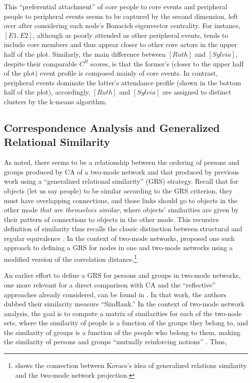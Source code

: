 \documentclass[a4paper,fleqn]{cas-sc}
\begin{document}
This ``preferential attachment'' \citep{barabasi1999emergence} of core people to core events and peripheral people to peripheral events seems to be captured by the second dimension, left over after considering each node's Bonacich eigenvector centrality. For instance, $\left[E1, E2\right]$, although as poorly attended as other peripheral events, tends to include core members and thus appear closer to other core actors in the upper half of the plot. Similarly, the main difference between $\left[Ruth\right]$ and $\left[Sylvia\right]$, despite their comparable $C^B$ scores, is that the former's (closer to the upper half of the plot) event profile is composed mainly of core events. In contrast, peripheral events dominate the latter's attendance profile (shown in the bottom half of the plot), accordingly, $\left[Ruth\right]$ and $\left[Sylvia\right]$ are assigned to distinct clusters by the k-means algorithm. 

\subsection{Correspondence Analysis and Generalized Relational Similarity} \label{subsec:cagensim}
As noted, there seems to be a relationship between the ordering of persons and groups produced by CA of a two-mode network and that produced by previous work using a ``generalized relational similarity'' (GRS) strategy. Recall that for objects (let us say people) to be similar according to the GRS criterion, they must have overlapping connections, and those links should go to objects in the other mode \textit{that are themselves similar}, where objects' similarities are given by their pattern of connections to objects in the other mode. This recursive definition of similarity thus recalls the classic distinction between structural and regular equivalence \citep{everett1994regular}. In the context of two-mode networks, \citet{kovacs2010generalized} proposed one such approach to defining a GRS for nodes in one and two-mode networks using a modified version of the correlation distance.\footnote{\citet{lizardo2024two} shows the connection between Kovacs's idea of generalized relations similarity and the two-mode network projection.}

An earlier effort to define a GRS for persons and groups in two-mode networks, one more relevant for a direct comparison with CA and the ``reflective'' approaches already considered, can be found in \citet{jeh2002simrank}. In that work, the authors dubbed their similarity measure ``SimRank.'' In the context of two-mode network analysis, the goal is to compute a matrix of similarities for each of the two-node sets, where the similarity of people is a function of the groups they belong to, and the similarity of groups is a function of the people who belong to them, making the similarity of persons and groups ``mutually reinforcing notions'' \citep[540]{jeh2002simrank}. Thus,
\end{document}
